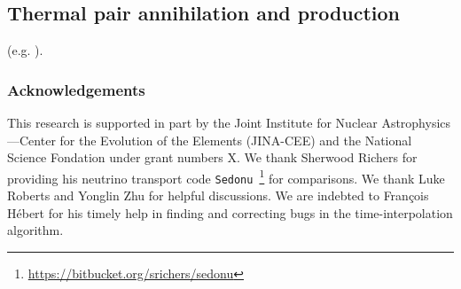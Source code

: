 \documentclass[aps,floatfix,prd,superscriptaddress,twocolumn]{revtex4-1}
\newcommand{\todo}[1]{\marginpar{\tiny{\textcolor{red}{#1}}}}
\begin{document}
\subsection{Thermal pair annihilation and production}
\label{ssec:sources_pp}
(e.g. \cite[Eqn.~A9]{brue1985-core_collapse}).

\subsubsection*{Acknowledgements}
This research is supported in part by the Joint Institute for Nuclear
Astrophysics---Center for the Evolution of the Elements (JINA-CEE)
and the National Science Fondation under grant numbers X. \todo{grant nos?}
We thank Sherwood Richers for providing his neutrino transport code
\lstinline{Sedonu}~\footnote{\url{https://bitbucket.org/srichers/sedonu}}
for comparisons.
We thank Luke Roberts and Yonglin Zhu for helpful discussions.
We are indebted to Fran\c{c}ois H\'{e}bert for his timely help in finding and
correcting bugs in the time-interpolation algorithm.


\end{document}

